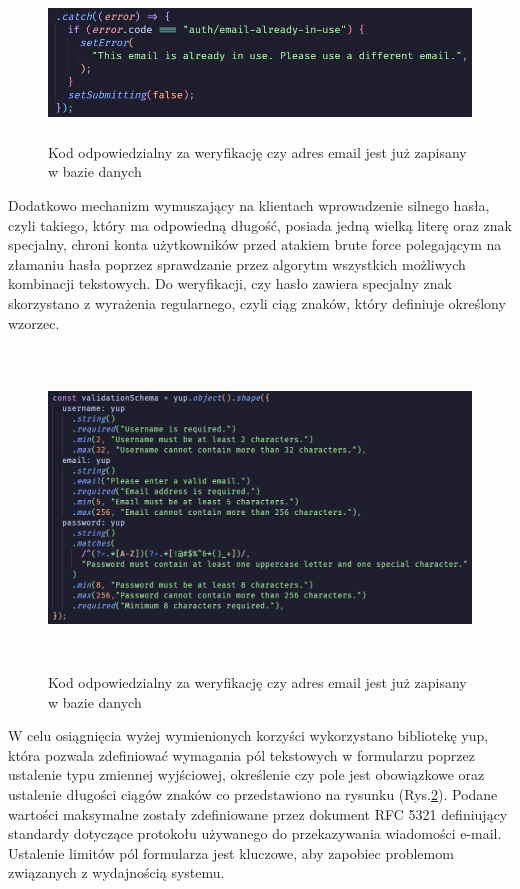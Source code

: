 \begin{figure}[ht]
	\centering
	\vspace{0.25cm}
	\includegraphics[height=4cm]{images/bezpieczenstwo/auth_email}
	\caption{Kod odpowiedzialny za weryfikację czy adres email jest już zapisany w bazie danych}
	\label{fig:Auth}
\end{figure}

Dodatkowo mechanizm wymuszający na klientach wprowadzenie silnego hasła, czyli takiego, który ma odpowiedną długość, posiada jedną wielką literę oraz znak specjalny, chroni konta użytkowników przed atakiem brute force polegającym na złamaniu hasła poprzez sprawdzanie przez algorytm wszystkich możliwych kombinacji tekstowych. Do weryfikacji, czy hasło zawiera specjalny znak skorzystano z wyrażenia regularnego, czyli ciąg znaków, który definiuje określony wzorzec.

\begin{figure}[ht]
	\centering
	\vspace{0.25cm}
	\includegraphics[height=8.5cm]{images/bezpieczenstwo/validationSchema}
	\caption{Kod odpowiedzialny za weryfikację czy adres email jest już zapisany w bazie danych}
	\label{fig:Validation}
\end{figure}

W celu osiągnięcia wyżej wymienionych korzyści wykorzystano bibliotekę yup, która pozwala zdefiniować wymagania pól tekstowych w formularzu poprzez ustalenie typu zmiennej wyjściowej, określenie czy pole jest obowiązkowe oraz ustalenie długości ciągów znaków co przedstawiono na rysunku (Rys.\ref{fig:Validation}). Podane wartości maksymalne zostały zdefiniowane przez dokument RFC 5321 \cite{rfc} definiujący standardy dotyczące protokołu używanego do przekazywania wiadomości e-mail. Ustalenie limitów pól formularza jest kluczowe, aby zapobiec problemom związanych z wydajnością systemu.

